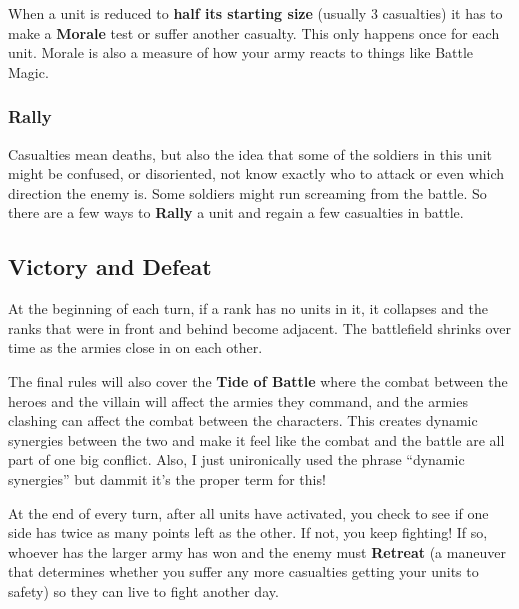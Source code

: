 \documentclass[letterpaper,twocolumn,openany,nodeprecatedcode]{dndbook}
\begin{document}
When a unit is reduced to \textbf{half its starting size} (usually 3 casualties) it has to make a \textbf{Morale} test or suffer another casualty. This only happens once for each unit. Morale is also a measure of how your army reacts to things like Battle Magic.

\subsubsection{Rally}

Casualties mean deaths, but also the idea that some of the soldiers in this unit might be confused, or disoriented, not know exactly who to attack or even which direction the enemy is. Some soldiers might run screaming from the battle. So there are a few ways to \textbf{Rally} a unit and regain a few casualties in battle.

\subsection{Victory and Defeat}

At the beginning of each turn, if a rank has no units in it, it collapses and the ranks that were in front and behind become adjacent. The battlefield shrinks over time as the armies close in on each other.

\begin{DndReadAloud}
The final rules will also cover the \textbf{Tide of Battle} where the combat between the heroes and the villain will affect the armies they command, and the armies clashing can affect the combat between the characters. This creates dynamic synergies between the two and make it feel like the combat and the battle are all part of one big conflict. Also, I just unironically used the phrase “dynamic synergies” but dammit it’s the proper term for this!
\end{DndReadAloud}

At the end of every turn, after all units have activated, you check to see if one side has twice as many points left as the other. If not, you keep fighting! If so, whoever has the larger army has won and the enemy must \textbf{Retreat} (a maneuver that determines whether you suffer any more casualties getting your units to safety) so they can live to fight another day.
\end{document}

